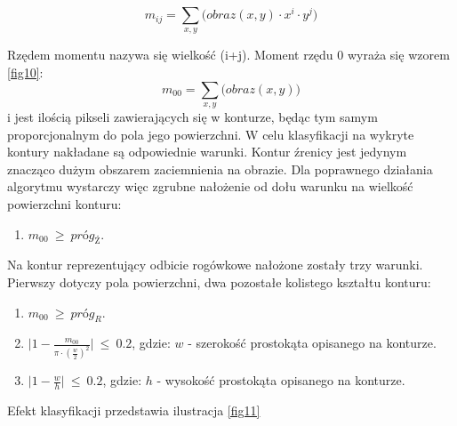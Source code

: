 \begin{equation}
  m_{ij}=\sum_{x,y}\Big(obraz(x,y)\cdot x^{i}\cdot y^{j}\Big)\label{eq2}
\end{equation}

\newpage
Rzędem momentu nazywa się wielkość (i+j). Moment rzędu 0 wyraża się wzorem \ref{fig10}:
\begin{equation}
  m_{00}=\sum_{x,y}\Big(obraz(x,y)\Big)\label{fig10}
\end{equation}
i jest ilością pikseli zawierających się w konturze, będąc tym samym proporcjonalnym do pola jego powierzchni. W celu klasyfikacji na wykryte kontury nakładane są odpowiednie warunki. Kontur źrenicy jest jedynym znacząco dużym obszarem zaciemnienia na obrazie. Dla poprawnego działania algorytmu wystarczy więc zgrubne nałożenie od dołu warunku na wielkość powierzchni konturu:
\begin{enumerate}
\item $\displaystyle m_{00}\  \geq\  \textit{próg}_{\textit{Ź}}$.
\end{enumerate}
Na kontur reprezentujący odbicie rogówkowe nałożone zostały trzy warunki. Pierwszy dotyczy pola powierzchni, dwa pozostałe kolistego kształtu konturu:
\begin{enumerate}
\item $\displaystyle m_{00}\  \geq\  \textit{próg}_{\textit{R}}$.
\item $\displaystyle \lvert1-\frac{m_{00}}{\pi\cdot (\frac{w}{2})^{2}}\rvert\  \leq\  0.2$,
gdzie: $w$ - szerokość prostokąta opisanego na konturze.
\item $\displaystyle \lvert1 - \frac{w}{h}\rvert\  \leq\  0.2$,
gdzie: $h$ - wysokość prostokąta opisanego na konturze.
\end{enumerate}   
Efekt klasyfikacji przedstawia ilustracja \ref{fig11}
